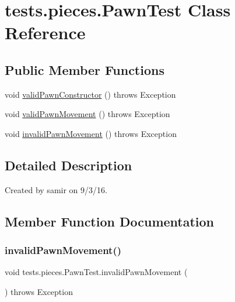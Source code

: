 \hypertarget{classtests_1_1pieces_1_1_pawn_test}{}\section{tests.\+pieces.\+Pawn\+Test Class Reference}
\label{classtests_1_1pieces_1_1_pawn_test}
\subsection*{Public Member Functions}
\begin{DoxyCompactItemize}
\item 
void \hyperlink{classtests_1_1pieces_1_1_pawn_test_a1c358f83062c1dcf97841cc61549d8f4}{valid\+Pawn\+Constructor} ()  throws Exception 
\item 
void \hyperlink{classtests_1_1pieces_1_1_pawn_test_a5f368d440aae4e9b128ed3a11b70bbc7}{valid\+Pawn\+Movement} ()  throws Exception 
\item 
void \hyperlink{classtests_1_1pieces_1_1_pawn_test_a2fd94e6381f006ac5ef2cf9b41974e3a}{invalid\+Pawn\+Movement} ()  throws Exception 
\end{DoxyCompactItemize}


\subsection{Detailed Description}
Created by samir on 9/3/16. 

\subsection{Member Function Documentation}
\hypertarget{classtests_1_1pieces_1_1_pawn_test_a2fd94e6381f006ac5ef2cf9b41974e3a}{}\label{classtests_1_1pieces_1_1_pawn_test_a2fd94e6381f006ac5ef2cf9b41974e3a} 
\subsubsection{\texorpdfstring{invalid\+Pawn\+Movement()}{invalidPawnMovement()}}
{\footnotesize\ttfamily void tests.\+pieces.\+Pawn\+Test.\+invalid\+Pawn\+Movement (\begin{DoxyParamCaption}{ }\end{DoxyParamCaption}) throws Exception}

